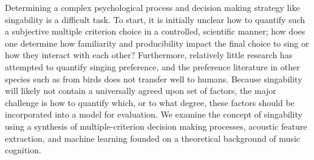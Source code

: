 Determining a complex psychological process and decision making strategy like singability is a difficult task. To start, it is initially unclear how to quantify such a subjective multiple criterion choice in a controlled, scientific manner; how does one determine how familiarity and producibility impact the final choice to sing or how they interact with each other? Furthermore, relatively little research has attempted to quantify singing preference, and the preference literature in other species such as from birds does not transfer well to humans. Because singability will likely not contain a universally agreed upon set of factors, the major challenge is how to quantify which, or to what degree, these factors should be incorporated into a model for evaluation. We examine the concept of singability using a synthesis of multiple-criterion decision making processes, acoustic feature extraction, and machine learning founded on a theoretical background of music cognition.

